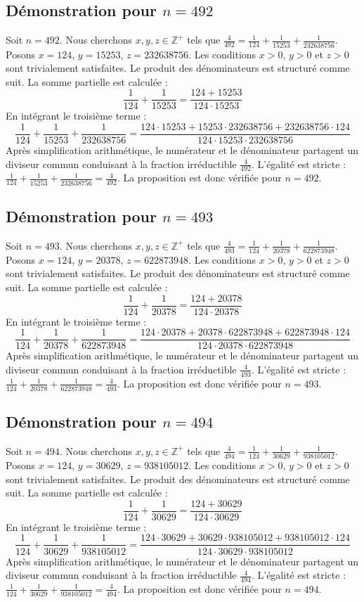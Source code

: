 \documentclass[11pt,a4paper]{article}
\begin{document}
\subsection{Démonstration pour $n = 492$}
Soit $n = 492$. Nous cherchons $x, y, z \in \mathbb{Z}^{+}$ tels que $\frac{4}{492} = \frac{1}{124} + \frac{1}{15253} + \frac{1}{232638756}$.
Posons $x = 124$, $y = 15253$, $z = 232638756$.
Les conditions $x > 0$, $y > 0$ et $z > 0$ sont trivialement satisfaites.
Le produit des dénominateurs est structuré comme suit. La somme partielle est calculée :
$$ \frac{1}{124} + \frac{1}{15253} = \frac{124+15253}{124 \cdot 15253} $$
En intégrant le troisième terme :
$$ \frac{1}{124} + \frac{1}{15253} + \frac{1}{232638756} = \frac{124 \cdot 15253 + 15253 \cdot 232638756 + 232638756 \cdot 124}{124 \cdot 15253 \cdot 232638756} $$
Après simplification arithmétique, le numérateur et le dénominateur partagent un diviseur commun conduisant à la fraction irréductible $\frac{4}{492}$.
L'égalité est stricte : $\frac{1}{124} + \frac{1}{15253} + \frac{1}{232638756} = \frac{4}{492}$.
La proposition est donc vérifiée pour $n = 492$.
\subsection{Démonstration pour $n = 493$}
Soit $n = 493$. Nous cherchons $x, y, z \in \mathbb{Z}^{+}$ tels que $\frac{4}{493} = \frac{1}{124} + \frac{1}{20378} + \frac{1}{622873948}$.
Posons $x = 124$, $y = 20378$, $z = 622873948$.
Les conditions $x > 0$, $y > 0$ et $z > 0$ sont trivialement satisfaites.
Le produit des dénominateurs est structuré comme suit. La somme partielle est calculée :
$$ \frac{1}{124} + \frac{1}{20378} = \frac{124+20378}{124 \cdot 20378} $$
En intégrant le troisième terme :
$$ \frac{1}{124} + \frac{1}{20378} + \frac{1}{622873948} = \frac{124 \cdot 20378 + 20378 \cdot 622873948 + 622873948 \cdot 124}{124 \cdot 20378 \cdot 622873948} $$
Après simplification arithmétique, le numérateur et le dénominateur partagent un diviseur commun conduisant à la fraction irréductible $\frac{4}{493}$.
L'égalité est stricte : $\frac{1}{124} + \frac{1}{20378} + \frac{1}{622873948} = \frac{4}{493}$.
La proposition est donc vérifiée pour $n = 493$.
\subsection{Démonstration pour $n = 494$}
Soit $n = 494$. Nous cherchons $x, y, z \in \mathbb{Z}^{+}$ tels que $\frac{4}{494} = \frac{1}{124} + \frac{1}{30629} + \frac{1}{938105012}$.
Posons $x = 124$, $y = 30629$, $z = 938105012$.
Les conditions $x > 0$, $y > 0$ et $z > 0$ sont trivialement satisfaites.
Le produit des dénominateurs est structuré comme suit. La somme partielle est calculée :
$$ \frac{1}{124} + \frac{1}{30629} = \frac{124+30629}{124 \cdot 30629} $$
En intégrant le troisième terme :
$$ \frac{1}{124} + \frac{1}{30629} + \frac{1}{938105012} = \frac{124 \cdot 30629 + 30629 \cdot 938105012 + 938105012 \cdot 124}{124 \cdot 30629 \cdot 938105012} $$
Après simplification arithmétique, le numérateur et le dénominateur partagent un diviseur commun conduisant à la fraction irréductible $\frac{4}{494}$.
L'égalité est stricte : $\frac{1}{124} + \frac{1}{30629} + \frac{1}{938105012} = \frac{4}{494}$.
La proposition est donc vérifiée pour $n = 494$.
\end{document}
